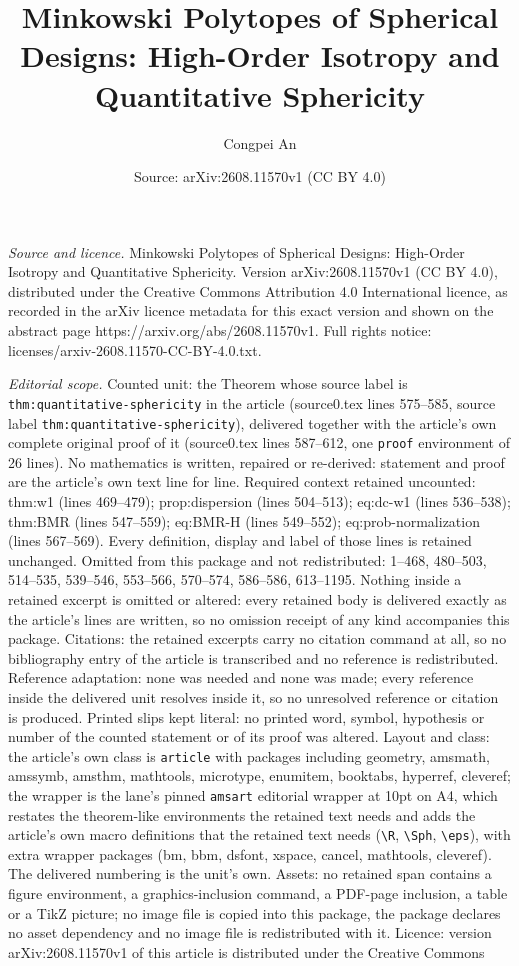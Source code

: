 \documentclass[10pt,a4paper]{amsart}
\title[Minkowski Polytopes of Spherical Designs: High-Order Isotrop]{Minkowski Polytopes of Spherical Designs: High-Order Isotropy and Quantitative Sphericity}
\author{Congpei An}
\date{Source: arXiv:2608.11570v1 (CC BY 4.0)}
\begin{document}
\maketitle

\noindent\emph{Source and licence.} Minkowski Polytopes of Spherical Designs: High-Order Isotropy and Quantitative Sphericity. Version arXiv:2608.11570v1 (CC BY 4.0), distributed under the Creative Commons Attribution 4.0 International licence, as recorded in the arXiv licence metadata for this exact version and shown on the abstract page https://arxiv.org/abs/2608.11570v1. Full rights notice: licenses/arxiv-2608.11570-CC-BY-4.0.txt.\par\smallskip

\noindent\textit{Editorial scope.} Counted unit: the Theorem whose source label is \texttt{thm:quantitative-sphericity} in the article (source0.tex lines 575--585, source label \texttt{thm:quantitative-sphericity}), delivered together with the article's own complete original proof of it (source0.tex lines 587--612, one \texttt{proof} environment of 26 lines). No mathematics is written, repaired or re-derived: statement and proof are the article's own text line for line. Required context retained uncounted: thm:w1 (lines 469--479); prop:dispersion (lines 504--513); eq:dc-w1 (lines 536--538); thm:BMR (lines 547--559); eq:BMR-H (lines 549--552); eq:prob-normalization (lines 567--569). Every definition, display and label of those lines is retained unchanged. Omitted from this package and not redistributed: 1--468, 480--503, 514--535, 539--546, 553--566, 570--574, 586--586, 613--1195. Nothing inside a retained excerpt is omitted or altered: every retained body is delivered exactly as the article's lines are written, so no omission receipt of any kind accompanies this package. Citations: the retained excerpts carry no citation command at all, so no bibliography entry of the article is transcribed and no reference is redistributed. Reference adaptation: none was needed and none was made; every reference inside the delivered unit resolves inside it, so no unresolved reference or citation is produced. Printed slips kept literal: no printed word, symbol, hypothesis or number of the counted statement or of its proof was altered. Layout and class: the article's own class is \texttt{article} with packages including geometry, amsmath, amssymb, amsthm, mathtools, microtype, enumitem, booktabs, hyperref, cleveref; the wrapper is the lane's pinned \texttt{amsart} editorial wrapper at 10pt on A4, which restates the theorem-like environments the retained text needs and adds the article's own macro definitions that the retained text needs (\texttt{\textbackslash R}, \texttt{\textbackslash Sph}, \texttt{\textbackslash eps}), with extra wrapper packages (bm, bbm, dsfont, xspace, cancel, mathtools, cleveref). The delivered numbering is the unit's own. Assets: no retained span contains a figure environment, a graphics-inclusion command, a PDF-page inclusion, a table or a TikZ picture; no image file is copied into this package, the package declares no asset dependency and no image file is redistributed with it. Licence: version arXiv:2608.11570v1 of this article is distributed under the Creative Commons 
\end{document}
